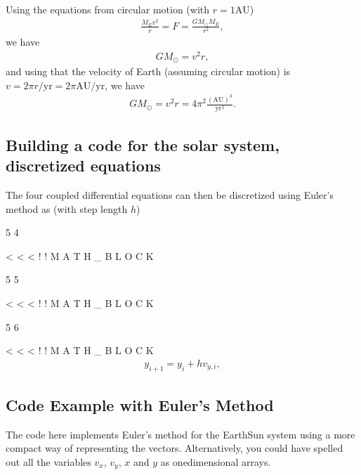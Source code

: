 \documentclass[letterpaper,10pt,english]{sphinxmanual}
\begin{document}
Using the equations from circular motion (with \(r =1\mathrm{AU}\))
\begin{equation*}
\begin{split}
\frac{M_E v^2}{r} = F = \frac{GM_{\odot}M_E}{r^2},
\end{split}
\end{equation*}
we have
\begin{equation*}
\begin{split}
GM_{\odot}=v^2r,
\end{split}
\end{equation*}
and using that the velocity of Earth (assuming circular motion) is
\(v = 2\pi r/\mathrm{yr}=2\pi\mathrm{AU}/\mathrm{yr}\), we have
\begin{equation*}
\begin{split}
GM_{\odot}= v^2r = 4\pi^2 \frac{(\mathrm{AU})^3}{\mathrm{yr}^2}.
\end{split}
\end{equation*}

\subsection{Building a code for the solar system, discretized equations}
\label{\detokenize{chapter3:building-a-code-for-the-solar-system-discretized-equations}}
The four coupled differential equations can then be discretized using Euler’s method as (with step length \(h\))

5
4

\textless{}
\textless{}
\textless{}
!
!
M
A
T
H
\_
B
L
O
C
K

5
5

\textless{}
\textless{}
\textless{}
!
!
M
A
T
H
\_
B
L
O
C
K

5
6

\textless{}
\textless{}
\textless{}
!
!
M
A
T
H
\_
B
L
O
C
K
\begin{equation*}
\begin{split}
y_{i+1}=y_i+hv_{y,i},
\end{split}
\end{equation*}

\subsection{Code Example with Euler’s Method}
\label{\detokenize{chapter3:code-example-with-euler-s-method}}
The code here implements Euler’s method for the Earth\sphinxhyphen{}Sun system using a more compact way of representing the vectors. Alternatively, you could have spelled out all the variables \(v_x\), \(v_y\), \(x\) and \(y\) as one\sphinxhyphen{}dimensional arrays.
\end{document}
